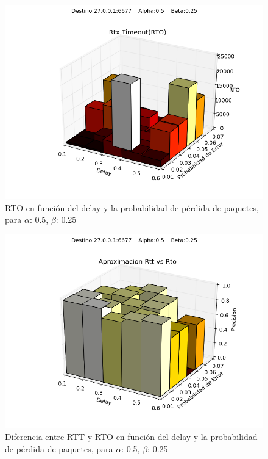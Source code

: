 \begin{figure}[H]
  \centering	
	\includegraphics[scale=0.5]{../analisis/graficos_tablas/graficos_en_funcion_de_delay_probaerror/0.5-0.25_2/rto.png}
  \caption{RTO en función del delay y la probabilidad de pérdida de paquetes, para $\alpha$: 0.5, $\beta$: 0.25}
	\label{fig:histo-src-sitiotrabajo}
\end{figure}



\begin{figure}[H]
  \centering	
	\includegraphics[scale=0.5]{../analisis/graficos_tablas/graficos_en_funcion_de_delay_probaerror/0.5-0.25_2/rtt_vs_rto.png}
  \caption{Diferencia entre RTT y RTO en funci\'on del delay y la probabilidad de pérdida de paquetes, para $\alpha$: 0.5, $\beta$: 0.25}
	\label{fig:histo-src-sitiotrabajo}
\end{figure}











